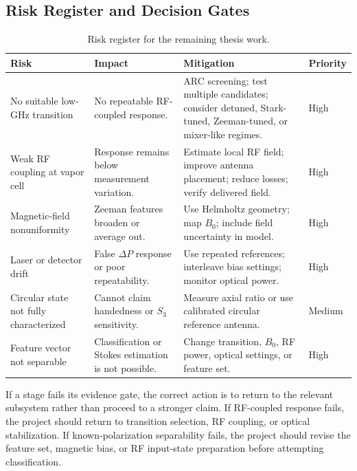 \documentclass{ieeeaccess}
\begin{document}
\subsection{Risk Register and Decision Gates}
\label{subsec:way_forward_risks}

\begin{table}[!t]
\caption{Risk register for the remaining thesis work.}
\label{tab:way_forward_risk_register}
\centering
\renewcommand{\arraystretch}{1.10}
\scriptsize
\begin{tabular}{p{} p{} p{} p{}}
\hline
\textbf{Risk} & \textbf{Impact} & \textbf{Mitigation} & \textbf{Priority} \\
\hline
No suitable low-GHz transition & No repeatable RF-coupled response. & ARC screening; test multiple candidates; consider detuned, Stark-tuned, Zeeman-tuned, or mixer-like regimes. & High \\
Weak RF coupling at vapor cell & Response remains below measurement variation. & Estimate local RF field; improve antenna placement; reduce losses; verify delivered field. & High \\
Magnetic-field nonuniformity & Zeeman features broaden or average out. & Use Helmholtz geometry; map \(B_0\); include field uncertainty in model. & High \\
Laser or detector drift & False \(\Delta P\) response or poor repeatability. & Use repeated references; interleave bias settings; monitor optical power. & High \\
Circular state not fully characterized & Cannot claim handedness or \(S_3\) sensitivity. & Measure axial ratio or use calibrated circular reference antenna. & Medium \\
Feature vector not separable & Classification or Stokes estimation is not possible. & Change transition, \(B_0\), RF power, optical settings, or feature set. & High \\
\hline
\end{tabular}
\end{table}

If a stage fails its evidence gate, the correct action is to return to the relevant subsystem rather than proceed to a stronger claim. If RF-coupled response fails, the project should return to transition selection, RF coupling, or optical stabilization. If known-polarization separability fails, the project should revise the feature set, magnetic bias, or RF input-state preparation before attempting classification.
\end{document}
